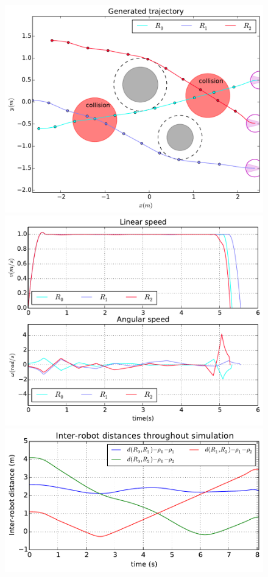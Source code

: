 \documentclass[eprint]{actapoly}
\begin{document}

\begin{figure}[!h]\centering
  \includegraphics[width=\linewidth]{./images/collision/multirobot-path.pdf} %
  \\[1mm]
  \includegraphics[width=\linewidth]{./images/collision/multirobot-vw.pdf} %
  \includegraphics[width=\linewidth]{./images/collision/multirobot-interr.pdf} %

\end{figure}
\end{document}
